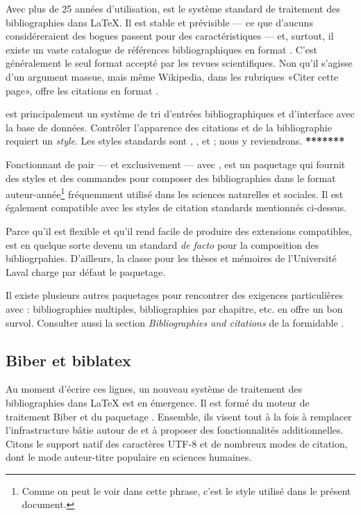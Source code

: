 Avec plus de 25 années d'utilisation, {\BibTeX} \citep{bibtex} est le
système standard de traitement des bibliographies dans {\LaTeX}. Il
est stable et prévisible --- ce que d'aucuns considéreraient des
bogues passent pour des caractéristiques --- et, surtout, il existe un
vaste catalogue de références bibliographiques en format {\BibTeX}.
C'est généralement le seul format accepté par les revues
scientifiques. Non qu'il s'agisse d'un argument massue, mais même
Wikipedia, dans les rubriques «Citer cette page», offre les citations
en format {\BibTeX}.

{\BibTeX} est principalement un système de tri d'entrées
bibliographiques et d'interface avec la base de données. Contrôler
l'apparence des citations et de la bibliographie requiert un
\emph{style}. Les styles standards sont , ,
 et ; nous y reviendrons. \textbf{*******}

Fonctionnant de pair --- et exclusivement --- avec {\BibTeX},
 \citep{natbib} est un paquetage qui fournit des styles et
des commandes pour composer des bibliographies dans le format
auteur-année\footnote{%
  Comme on peut le voir dans cette phrase, c'est le style utilisé dans
  le présent document.} %
fréquemment utilisé dans les sciences naturelles et sociales. Il est
également compatible avec les styles de citation standards mentionnés
ci-dessus.

Parce qu'il est flexible et qu'il rend facile de produire des
extensions compatibles,  est en quelque sorte devenu un
standard \emph{de facto} pour la composition des bibliogrpahies.
D'ailleurs, la classe  pour les thèses et mémoires de
l'Université Laval charge par défaut le paquetage.

Il existe plusieurs autres paquetages pour rencontrer des exigences
particulières avec {\BibTeX}: bibliographies multiples, bibliographies
par chapitre, etc. \citet{Mori:bibliographies:2009} en offre un bon
survol. Consulter aussi la section \emph{Bibliographies and citations}
de la formidable %
.


\subsection{Biber et biblatex}
\label{sec:bibliographie:systeme:biblatex}

Au moment d'écrire ces lignes, un nouveau système de traitement des
bibliographies dans {\LaTeX} est en émergence. Il est formé du moteur
de traitement Biber \citep{biber} et du paquetage 
\citep{biblatex}. Ensemble, ils visent tout à la fois à remplacer
l'infrastructure bâtie autour de {\BibTeX} et à proposer des
fonctionnalités additionnelles. Citons le support natif des caractères
UTF-8 et de nombreux modes de citation, dont le mode
auteur-titre populaire en sciences humaines.

